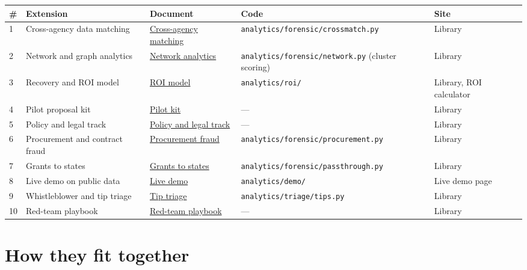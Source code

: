 \documentclass[letterpaper,11pt]{article}
\begin{document}
\begingroup\small\setlength{\tabcolsep}{4pt}\renewcommand{\arraystretch}{1.25}
\begin{longtable}[l]{@{}l>{\raggedright\arraybackslash}p{}>{\raggedright\arraybackslash}p{}>{\raggedright\arraybackslash}p{}>{\raggedright\arraybackslash}p{}@{}}
\rowcolor{coolblack}\leavevmode\color{white}\bfseries \# & \leavevmode\color{white}\bfseries Extension & \leavevmode\color{white}\bfseries Document & \leavevmode\color{white}\bfseries Code & \leavevmode\color{white}\bfseries Site \\
\endhead
1 & Cross-agency data matching & \href{playbook/cross_agency_matching.pdf}{Cross-agency matching} & \texttt{analytics/forensic/crossmatch.py} & Library \\
2 & Network and graph analytics & \href{playbook/network_analytics.pdf}{Network analytics} & \texttt{analytics/forensic/network.py} (cluster scoring) & Library \\
3 & Recovery and ROI model & \href{proposals/roi_model.pdf}{ROI model} & \texttt{analytics/roi/} & Library, ROI calculator \\
4 & Pilot proposal kit & \href{proposals/pilot_kit.pdf}{Pilot kit} & --- & Library \\
5 & Policy and legal track & \href{policy/legal_track.pdf}{Policy and legal track} & --- & Library \\
6 & Procurement and contract fraud & \href{playbook/procurement_fraud.pdf}{Procurement fraud} & \texttt{analytics/forensic/procurement.py} & Library \\
7 & Grants to states & \href{research/grants_to_states.pdf}{Grants to states} & \texttt{analytics/forensic/passthrough.py} & Library \\
8 & Live demo on public data & \href{demo/live_demo.pdf}{Live demo} & \texttt{analytics/demo/} & Live demo page \\
9 & Whistleblower and tip triage & \href{playbook/tip_triage.pdf}{Tip triage} & \texttt{analytics/triage/tips.py} & Library \\
10 & Red-team playbook & \href{playbook/red_team.pdf}{Red-team playbook} & --- & Library \\
\end{longtable}\endgroup

\hypertarget{how-they-fit-together}{%
\section{How they fit together}\label{how-they-fit-together}}
\end{document}
